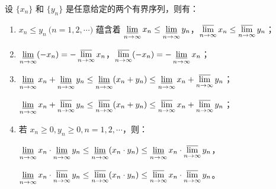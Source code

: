 \begin{theorem}
	设 $\{x_n\}$ 和 $\{y_n\}$ 是任意给定的两个有界序列，则有：
	\begin{enumerate}
		\item $x_n \le y_n \pod{n = 1, 2, \cdots}$ 蕴含着 $\mathop{\underline \lim}\limits_{n \rightarrow \infty} x_n \le \mathop{\underline \lim}\limits_{n \rightarrow \infty} y_n$，$\mathop{\overline \lim}\limits_{n \rightarrow \infty} x_n \le \mathop{\overline \lim}\limits_{n \rightarrow \infty} y_n$；
		\item $\mathop{\underline \lim}\limits_{n \rightarrow \infty}  (-x_n) = - \mathop{\overline \lim}\limits_{n \rightarrow \infty} x_n$，$\mathop{\overline \lim}\limits_{n \rightarrow \infty} (-x_n) = -\mathop{\underline \lim}\limits_{n \rightarrow \infty} x_n$；
		\item $\mathop{\underline \lim}\limits_{n \rightarrow \infty} x_n + \mathop{\underline \lim}\limits_{n \rightarrow \infty} y_n \le \mathop{\underline \lim}\limits_{n \rightarrow \infty} (x_n + y_n) \le \mathop{\underline \lim}\limits_{n \rightarrow \infty} x_n + \mathop{\overline \lim}\limits_{n \rightarrow \infty} y_n$；

		$\mathop{\underline \lim}\limits_{n \rightarrow \infty} x_n + \mathop{\overline \lim}\limits_{n \rightarrow \infty} y_n \le \mathop{\overline \lim}\limits_{n \rightarrow \infty} (x_n + y_n) \le \mathop{\overline \lim}\limits_{n \rightarrow \infty} x_n + \mathop{\overline \lim}\limits_{n \rightarrow \infty} y_n$；

		\item 若 $x_n \ge 0, y_n \ge 0, n = 1, 2, \cdots$，则：

		$\mathop{\underline \lim}\limits_{n \rightarrow \infty} x_n \cdot \mathop{\underline \lim}\limits_{n \rightarrow \infty} y_n \le \mathop{\underline \lim}\limits_{n \rightarrow \infty} (x_n \cdot y_n) \le \mathop{\underline \lim}\limits_{n \rightarrow \infty} x_n \cdot \mathop{\overline \lim}\limits_{n \rightarrow \infty} y_n$，

		$\mathop{\underline \lim}\limits_{n \rightarrow \infty} x_n \cdot \mathop{\overline \lim}\limits_{n \rightarrow \infty} y_n \le \mathop{\overline \lim}\limits_{n \rightarrow \infty} (x_n \cdot y_n) \le \mathop{\overline \lim}\limits_{n \rightarrow \infty} x_n \cdot \mathop{\overline \lim}\limits_{n \rightarrow \infty} y_n$。
	\end{enumerate}
\end{theorem}